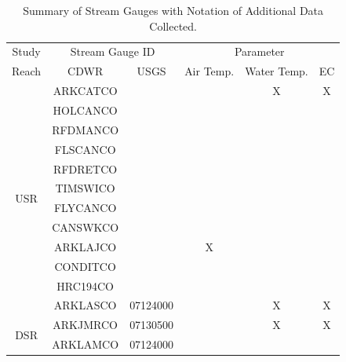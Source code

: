 \begin{linenumbers}
\begin{table}[htbp]
  \centering
  \caption[Summary of Stream Gauges with Notation of Additional Data Collected.]{Summary of Stream Gauges with Notation of Additional Data Collected.}
  \label{tab:gauge other data}
  \begin{tabular}{cccccc}
  	\toprule
  	        Study         & \multicolumn{2}{c}{Stream Gauge ID} & \multicolumn{3}{c}{Parameter} \\
  	        Reach         &   CDWR    &          USGS           & Air Temp. & Water Temp. & EC  \\ \toprule
  	\multirow{12}{*}{USR} & ARKCATCO  &                         &           &      X      &  X  \\
  	                      & HOLCANCO  &                         &           &             &  \\
  	                      & RFDMANCO  &                         &           &             &  \\
  	                      & FLSCANCO  &                         &           &             &  \\
  	                      & RFDRETCO  &                         &           &             &  \\
  	                      & TIMSWICO  &                         &           &             &  \\
  	                      & FLYCANCO  &                         &           &             &  \\
  	                      & CANSWKCO  &                         &           &             &  \\
  	                      & ARKLAJCO  &                         &     X     &             &  \\
  	                      & CONDITCO  &                         &           &             &  \\
  	                      & HRC194CO  &                         &           &             &  \\
  	                      & ARKLASCO  &        07124000         &           &      X      &  X  \\ \midrule
  	\multirow{7}{*}{DSR}  & ARKJMRCO  &        07130500         &           &      X      &  X  \\
  	                      & ARKLAMCO  &        07124000         &           &             &  \\

\end{tabular}
\end{table}
\end{linenumbers}
